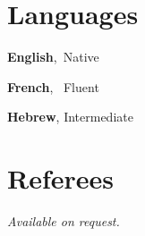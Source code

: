 \documentclass[margin,line]{resume}
\begin{document}
\begin{resume}
    \section{\mysidestyle Languages} 
       \textbf{English}, \qquad \,Native \hfill

\vspace{-2mm}
       \textbf{French}, \qquad \, Fluent \hfill

\vspace{-2mm}
 \textbf{Hebrew}, \qquad Intermediate \hfill
    \section{\mysidestyle Referees} 
    {\sl Available on request.}



%
%



\end{resume}
\end{document}
